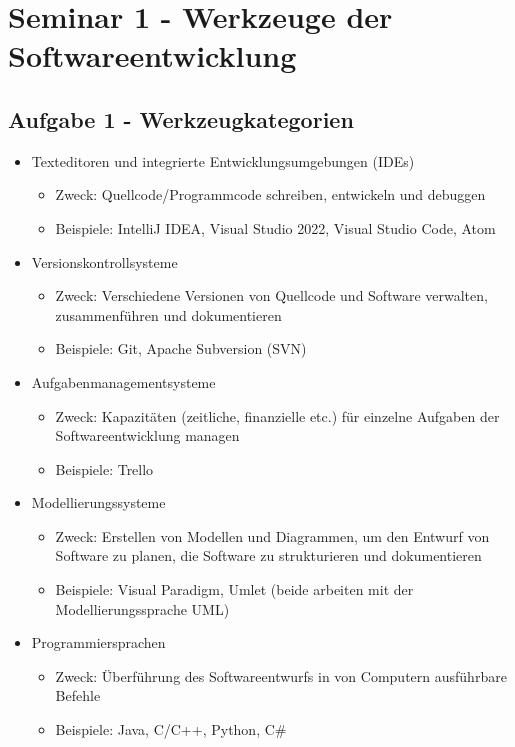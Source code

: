 

\section{Seminar 1 - Werkzeuge der Softwareentwicklung}


\subsection{Aufgabe 1 - Werkzeugkategorien}

\begin{itemize}
	\item Texteditoren und integrierte Entwicklungsumgebungen (IDEs)
	\begin{itemize}
		\item Zweck: Quellcode/Programmcode schreiben, entwickeln und debuggen
		\item Beispiele: IntelliJ IDEA, Visual Studio 2022, Visual Studio Code, Atom
	\end{itemize}
	\item Versionskontrollsysteme
	\begin{itemize}
		\item Zweck: Verschiedene Versionen von Quellcode und Software verwalten, zusammenführen und dokumentieren
		\item Beispiele: Git, Apache Subversion (SVN)
	\end{itemize}
	\item Aufgabenmanagementsysteme
	\begin{itemize}
		\item Zweck: Kapazitäten (zeitliche, finanzielle etc.) für einzelne Aufgaben der Softwareentwicklung managen
		\item Beispiele: Trello
	\end{itemize}
	\item Modellierungssysteme
	\begin{itemize}
		\item Zweck: Erstellen von Modellen und Diagrammen, um den Entwurf von Software zu planen, die Software zu strukturieren und dokumentieren
		\item Beispiele: Visual Paradigm, Umlet (beide arbeiten mit der Modellierungssprache UML)
	\end{itemize}
	\item Programmiersprachen 
	\begin{itemize}
		\item Zweck: Überführung des Softwareentwurfs in von Computern ausführbare Befehle
		\item Beispiele: Java, C/C++, Python, C\#
	\end{itemize}
\end{itemize}



